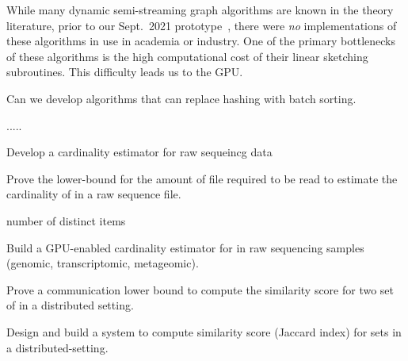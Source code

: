 While many dynamic semi-streaming graph algorithms\cite{Ahn2012, Ahn2012_2, AhnGM13, GuhaMT15, KapralovLMMS13, ChitnisCEHMMV16, AssadiKL16, McGregorVV16, pagh2012colorful, 10.1007/978-3-662-48054-0_39, clustering, 10.1007/978-3-319-21398-9_57, streamsetbounds, Chakrabarti2015IncidenceGA, kveton2016graphical, CrouchMS13} are known in the theory literature, prior to our Sept.\ 2021 prototype~\cite{graphzeppelin}, there were \emph{no} implementations of these algorithms in use in academia or industry.  One of the primary bottlenecks of these algorithms is the high computational cost of their linear sketching subroutines. This difficulty leads us to the GPU.


\begin{rproblem}
Can we develop algorithms that can replace hashing with batch sorting.
\end{rproblem}



.....



\begin{rproblem}
Develop a cardinality estimator for raw sequeincg data 

Prove the lower-bound for the amount of file required to be read to estimate the cardinality of \kmer in a raw sequence file.
\end{rproblem}

number of distinct items

\begin{rproblem}
Build a GPU-enabled cardinality estimator for \kmers in raw sequencing samples (genomic, transcriptomic, metageomic).
\end{rproblem}

\begin{rproblem}
Prove a communication lower bound to compute the similarity score for two set of \kmers in a distributed setting.
\end{rproblem}


\begin{rproblem}
Design and build a system to compute similarity score (Jaccard index) for \kmer sets in a distributed-setting.
\end{rproblem}
